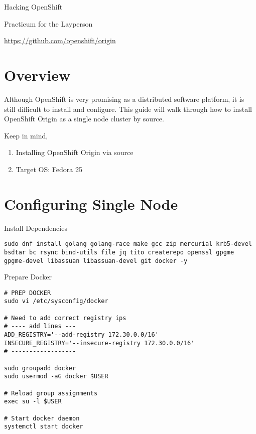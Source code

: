 \documentclass{article}
\begin{document}
\centerline{\sc \large Hacking OpenShift}
\centerline{\sc Practicum for the Layperson }
\centerline{\url{https://github.com/openshift/origin}}

\section{Overview}
\hspace{3pc} Although OpenShift is very promising as a distributed software platform, it is still difficult to install and 
configure. This guide will walk through how to install OpenShift Origin as a single node cluster by source.

\begin{figure}
\end{figure}

Keep in mind,
\begin{enumerate}[(1)]
  \item Installing OpenShift Origin via source
  \item Target OS: Fedora 25
\end{enumerate}

\section{Configuring Single Node}

Install Dependencies
\begin{lstlisting}[style=shell]
sudo dnf install golang golang-race make gcc zip mercurial krb5-devel bsdtar bc rsync bind-utils file jq tito createrepo openssl gpgme gpgme-devel libassuan libassuan-devel git docker -y
\end{lstlisting}

Prepare Docker
\begin{lstlisting}[style=shell]
# PREP DOCKER
sudo vi /etc/sysconfig/docker

# Need to add correct registry ips
# ---- add lines ---
ADD_REGISTRY='--add-registry 172.30.0.0/16'
INSECURE_REGISTRY='--insecure-registry 172.30.0.0/16'
# ------------------

sudo groupadd docker
sudo usermod -aG docker $USER

# Reload group assignments
exec su -l $USER

# Start docker daemon
systemctl start docker
\end{lstlisting}
\end{document}
